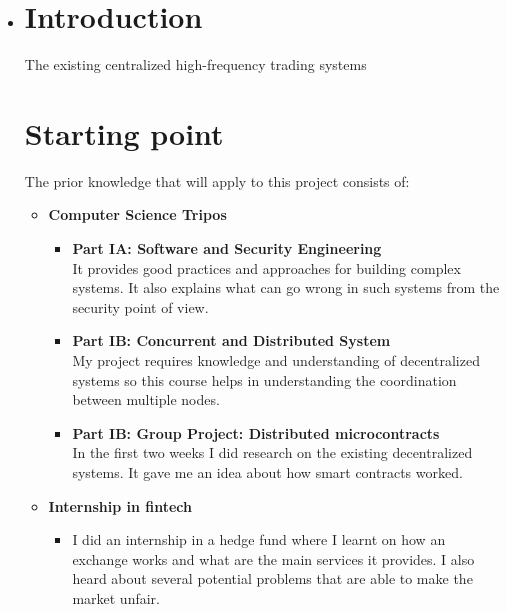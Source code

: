 \documentclass[12p]{report}
\begin{document}
\begin{itemize}[label={},leftmargin=-20mm]
\item
\section*{\LARGE Introduction}

The existing centralized high-frequency trading systems 

\section*{\LARGE Starting point}
\begin{large}
\hspace{3mm} The prior knowledge that will apply to this project consists of:
\begin{itemize}[label={$\bullet$}, leftmargin=15mm]
    \item{\bf Computer Science Tripos}
    \begin{itemize}[label = {--}, leftmargin=10mm]
    \item{{\bf Part IA: Software and Security Engineering} \\ It provides good practices and approaches for building complex systems. It also explains what can go wrong in such systems from the security point of view. }
    \item{{\bf Part IB: Concurrent and Distributed System} \\ My project requires knowledge and understanding of decentralized systems so this course helps in understanding the coordination between multiple nodes.}
    \item{{\bf Part IB: Group Project: Distributed microcontracts} \\ In the first two weeks I did research on the existing decentralized systems. It gave me an idea about how smart contracts worked.}
    \end{itemize}
    \item{\bf Internship in fintech}
    \begin{itemize}[label = {}, leftmargin=10mm]
    \item{I did an internship in a hedge fund where I learnt on how an exchange works and what are the main services it provides. I also heard about several potential problems that are able to make the market unfair.}
    \end{itemize}
\end{itemize}

\hspace{5mm}


\end{large}
\end{itemize}
\end{document}
